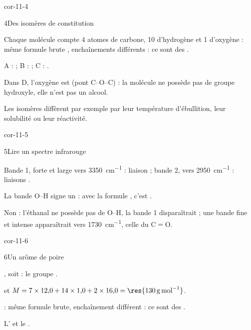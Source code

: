 \begin{blocLivre}{cor-11-4}
\begin{corrige}{4}{Des isomères de constitution}
\begin{questions}
\item Chaque molécule compte 4 atomes de carbone, 10 d'hydrogène et 1 d'oxygène : même formule brute ,
enchaînements différents : ce sont des .
\item A :  ; B :  ; C : .
\item Dans D, l'oxygène est  (pont C--O--C) : la molécule ne possède pas de groupe
hydroxyle, elle n'est pas un alcool.
\item Les isomères diffèrent par exemple par leur température d'ébullition, leur solubilité ou leur réactivité.
\end{questions}
\end{corrige}
\end{blocLivre}
\begin{blocLivre}{cor-11-5}
\begin{corrige}{5}{Lire un spectre infrarouge}
\begin{questions}
\item Bande 1, forte et large vers \qty{3350}{cm^{-1}} : liaison  ; bande 2, vers
\qty{2950}{cm^{-1}} : liaisons .
\item La bande O--H signe un  : avec la formule , c'est
.
\item Non : l'éthanal ne possède pas de O--H, la bande 1 disparaîtrait ; une bande fine et intense apparaîtrait vers
\qty{1730}{cm^{-1}}, celle du C$=$O.
\end{questions}
\end{corrige}
\end{blocLivre}
\begin{blocLivre}{cor-11-6}
\begin{corrige}{6}{Un arôme de poire}
\begin{questions}
\item {}, soit
\; : le groupe
 .
\item {} et $M=7\times12{,}0+14\times1{,}0+2\times16{,}0=\res{\qty{130}{g.mol^{-1}}}$.
\item {} : même formule brute, enchaînement différent : ce sont des
.
\item L' et le .
\end{questions}
\end{corrige}
\end{blocLivre}
